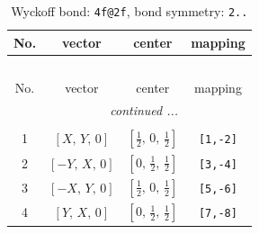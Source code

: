 \documentclass[fleqn,8pt]{jsarticle}
\begin{document}
\renewcommand{\arraystretch}{1.2}
\begin{longtable}{cccc}
\caption{Wyckoff bond: {\tt 4f@2f}, bond symmetry: {\tt 2..}}
 \\
 \hline \hline
No. & vector & center & mapping \\ \hline \endfirsthead

\multicolumn{3}{l}{\tablename\ \thetable{}} \\
 \hline \hline
No. & vector & center & mapping \\ \hline \endhead

 \hline \hline
\multicolumn{3}{r}{\footnotesize\it continued ...} \\ \endfoot

 \hline \hline
\multicolumn{3}{r}{} \\ \endlastfoot

1 & $\left[ X,\, Y,\, 0 \right]$ & $\left[ \frac{1}{2},\, 0,\, \frac{1}{2} \right]$ & {\tt [1,-2]} \\ \hline
2 & $\left[ - Y,\, X,\, 0 \right]$ & $\left[ 0,\, \frac{1}{2},\, \frac{1}{2} \right]$ & {\tt [3,-4]} \\ \hline
3 & $\left[ - X,\, Y,\, 0 \right]$ & $\left[ \frac{1}{2},\, 0,\, \frac{1}{2} \right]$ & {\tt [5,-6]} \\ \hline
4 & $\left[ Y,\, X,\, 0 \right]$ & $\left[ 0,\, \frac{1}{2},\, \frac{1}{2} \right]$ & {\tt [7,-8]} \\
\end{longtable}
\renewcommand{\arraystretch}{1.2}
\end{document}
